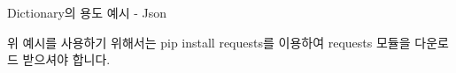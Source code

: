 \documentclass{beamer}
\newenvironment{slide}[1][]
{%
  \begin{frame}[allowframebreaks,#1]%
  }{%
  \end{frame}%
}
\newcommand{\python}[2]{} %
\begin{document}
\begin{slide}[fragile, environment=slide]{Dictionary의 용도 예시  -  Json} 

\python{request_example.py}{사전 뒤집기}
위 예시를 사용하기 위해서는 pip install requests를 이용하여 requests 모듈을 다운로드 받으셔야 합니다. 

\end{slide}
\end{document}
